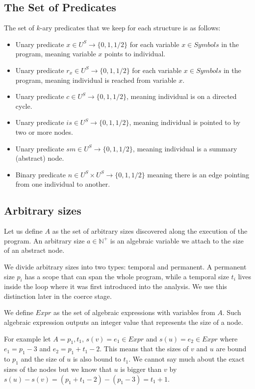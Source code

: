 \subsection*{The Set of Predicates}
The set of $k$-ary predicates that we keep for each structure is as follows:
\begin{itemize}
	\item Unary predicate $x\in U^S\to \{0,1,1/2\}$ for each variable $x\in Symbols$ in the program, meaning variable $x$ points to individual.
	\item Unary predicate $r_x\in U^S\to \{0,1,1/2\}$ for each variable $x\in Symbols$ in the program, meaning individual is reached from variable $x$.
	\item Unary predicate $c\in U^S\to \{0,1,1/2\}$, meaning individual is on a directed cycle.
	\item Unary predicate $is\in U^S\to \{0,1,1/2\}$, meaning individual is pointed to by two or more nodes.
	\item Unary predicate $sm\in U^S\to \{0,1,1/2\}$, meaning individual is a summary (abstract) node.
	\item Binary predicate $n\in U^S\times U^S\to \{0,1,1/2\}$ meaning there is an edge pointing from one individual to another.
\end{itemize}

\subsection*{Arbitrary sizes}
Let us define $A$ as the set of arbitrary sizes discovered along the execution of the program. An arbitrary size $a\in\mathbb{N}^+$ is an algebraic variable we attach to the size of an abstract node.

We divide arbitrary sizes into two types: temporal and permanent. A permanent size $p_i$ has a scope that can span the whole program, while a temporal size $t_i$ lives inside the loop where it was first introduced into the analysis. We use this distinction later in the coerce stage.

We define $Expr$ as the set of algebraic expressions with variables from $A$. Such algebraic expression outputs an integer value that represents the size of a node.

For example let $A={p_1,t_1}$, $s(v)=e_1\in Expr$ and $s(u)=e_2\in Expr$ where $e_1=p_1-3$ and $e_2=p_1+t_1-2$. This means that the sizes of $v$ and $u$ are bound to $p_1$ and the size of $u$ is also bound to $t_1$. We cannot say much about the exact sizes of the nodes but we know that $u$ is bigger than $v$ by $s(u)-s(v)=(p_1+t_1-2)-(p_1-3)=t_1+1$.

